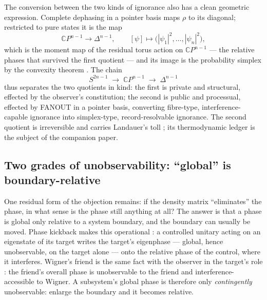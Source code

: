 The conversion between the two kinds of ignorance also has a clean
geometric expression. Complete dephasing in a pointer basis
\autocite{zurek2003decoherence} maps $\rho$ to its diagonal; restricted
to pure states it is the map
\[
  \mathbb{C}P^{n-1} \longrightarrow \Delta^{n-1}, \qquad
  [\psi] \longmapsto \bigl(|\psi_1|^2, \dots, |\psi_n|^2\bigr),
\]
which is the moment map of the residual torus action on
$\mathbb{C}P^{n-1}$ --- the relative phases that survived the first
quotient --- and its image is the probability simplex by the convexity
theorem \autocite{atiyah1982convexity}. The chain
\[
  S^{2n-1} \;\longrightarrow\; \mathbb{C}P^{n-1}
  \;\longrightarrow\; \Delta^{n-1}
\]
thus separates the two quotients in kind: the first is private and
structural, effected by the observer's constitution; the second is
public and processual, effected by FANOUT in a pointer basis,
converting fibre-type, interference-capable ignorance into
simplex-type, record-resolvable ignorance. The second quotient is
irreversible and carries Landauer's toll
\autocite{Landauer_1961}; its thermodynamic ledger is
the subject of the companion paper.

\subsection{Two grades of unobservability: ``global'' is
  boundary-relative}
\label{app:jaynes:boundary}

One residual form of the objection remains: if the density matrix
``eliminates'' the phase, in what sense is the phase still anything at
all? The answer is that a phase is global only relative to a system
boundary, and the boundary can usually be moved. Phase kickback makes
this operational \autocite{cleve1998quantum}: a controlled unitary
acting on an eigenstate of its target writes the target's eigenphase
--- global, hence unobservable, on the target alone --- onto the
relative phase of the control, where it interferes. Wigner's friend is
the same fact with the observer in the target's role
\autocite{wigner_1961}: the friend's overall phase is
unobservable to the friend and interference-accessible to Wigner. A
subsystem's global phase is therefore only \emph{contingently}
unobservable: enlarge the boundary and it becomes relative.

